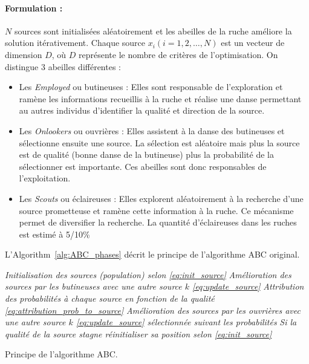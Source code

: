 \paragraph{Formulation :} %
\label{par:formulation}
$N$ sources sont initialisées aléatoirement et les abeilles de la
ruche améliore la solution itérativement. Chaque source $x_{i}(i = 1, 2, \dotsc, N)$ est un vecteur
de dimension $D$, où $D$ représente le nombre de critères de l’optimisation.
On distingue 3 abeilles différentes :
\begin{itemize}
  \item Les \emph{Employed} ou butineuses : Elles sont responsable de l’exploration
        et ramène les informations recueillis à la ruche et réalise une danse
        permettant au autres individus d’identifier la qualité et direction de la
        source.
  \item Les \emph{Onlookers} ou ouvrières : Elles assistent à la danse des butineuses
        et sélectionne ensuite une source. La sélection est aléatoire mais plus
        la source est de qualité (bonne danse de la butineuse) plus la probabilité
        de la sélectionner est importante.
        Ces abeilles sont donc responsables de l’exploitation.
  \item Les \emph{Scouts} ou éclaireuses : Elles explorent aléatoirement à la recherche
        d’une source prometteuse et ramène cette information à la ruche. Ce mécanisme
        permet de diversifier la recherche. La quantité d’éclaireuses dans les ruches
        est estimé à 5/10\si{\percent} \parencite{Seeley1996}
\end{itemize}


L’Algorithm~\ref{alg:ABC_phases} décrit le principe de l’algorithme ABC original.
\begin{algorithm}\label{alg:ABC_phases}
  \SetAlgoVlined
  \emph{Initialisation des sources (population) selon \eqref{eq:init_source}}\;
  {
  {
    \emph{Amélioration des sources par les butineuses avec une autre source $k$ \eqref{eq:update_source}}\;
    \emph{Attribution des probabilités à chaque source en fonction de la qualité
          \eqref{eq:attribution_prob_to_source}}\;
    \emph{Amélioration des sources par les ouvrières avec une autre source $k$ \eqref{eq:update_source}
          sélectionnée suivant les probabilités}\;
    \emph{Si la qualité de la source stagne réinitialiser sa position selon \eqref{eq:init_source}}\;
  }
  }
  \caption{Principe de l’algorithme ABC.}
\end{algorithm}

